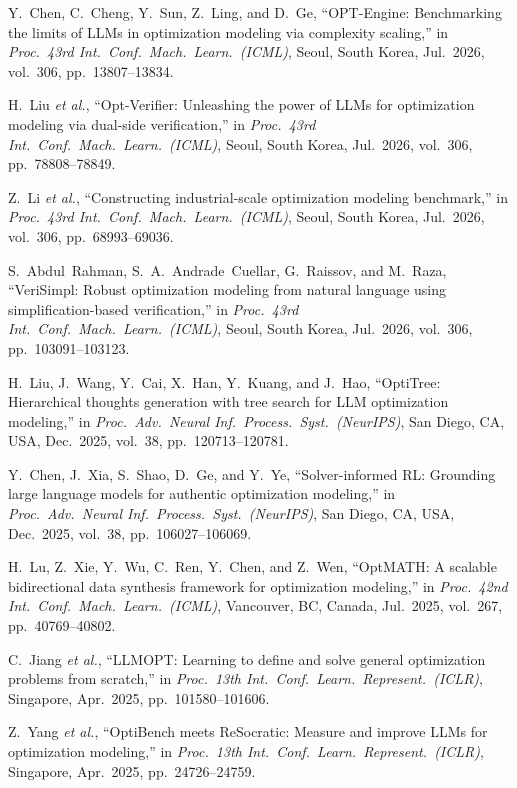 \documentclass[11pt,a4paper]{article}
\begin{document}
{\small
\begin{enumerate}[label={[\arabic*]}, leftmargin=2.2em, itemsep=1pt]
\item Y.~Chen, C.~Cheng, Y.~Sun, Z.~Ling, and D.~Ge, ``OPT-Engine: Benchmarking the limits of LLMs in optimization modeling via complexity scaling,'' in \textit{Proc.\ 43rd Int.\ Conf.\ Mach.\ Learn.\ (ICML)}, Seoul, South Korea, Jul.\ 2026, vol.~306, pp.~13807--13834.
\item H.~Liu \textit{et al.}, ``Opt-Verifier: Unleashing the power of LLMs for optimization modeling via dual-side verification,'' in \textit{Proc.\ 43rd Int.\ Conf.\ Mach.\ Learn.\ (ICML)}, Seoul, South Korea, Jul.\ 2026, vol.~306, pp.~78808--78849.
\item Z.~Li \textit{et al.}, ``Constructing industrial-scale optimization modeling benchmark,'' in \textit{Proc.\ 43rd Int.\ Conf.\ Mach.\ Learn.\ (ICML)}, Seoul, South Korea, Jul.\ 2026, vol.~306, pp.~68993--69036.
\item S.~Abdul~Rahman, S.~A.~Andrade~Cuellar, G.~Raissov, and M.~Raza, ``VeriSimpl: Robust optimization modeling from natural language using simplification-based verification,'' in \textit{Proc.\ 43rd Int.\ Conf.\ Mach.\ Learn.\ (ICML)}, Seoul, South Korea, Jul.\ 2026, vol.~306, pp.~103091--103123.
\item H.~Liu, J.~Wang, Y.~Cai, X.~Han, Y.~Kuang, and J.~Hao, ``OptiTree: Hierarchical thoughts generation with tree search for LLM optimization modeling,'' in \textit{Proc.\ Adv.\ Neural Inf.\ Process.\ Syst.\ (NeurIPS)}, San Diego, CA, USA, Dec.\ 2025, vol.~38, pp.~120713--120781.
\item Y.~Chen, J.~Xia, S.~Shao, D.~Ge, and Y.~Ye, ``Solver-informed RL: Grounding large language models for authentic optimization modeling,'' in \textit{Proc.\ Adv.\ Neural Inf.\ Process.\ Syst.\ (NeurIPS)}, San Diego, CA, USA, Dec.\ 2025, vol.~38, pp.~106027--106069.
\item H.~Lu, Z.~Xie, Y.~Wu, C.~Ren, Y.~Chen, and Z.~Wen, ``OptMATH: A scalable bidirectional data synthesis framework for optimization modeling,'' in \textit{Proc.\ 42nd Int.\ Conf.\ Mach.\ Learn.\ (ICML)}, Vancouver, BC, Canada, Jul.\ 2025, vol.~267, pp.~40769--40802.
\item C.~Jiang \textit{et al.}, ``LLMOPT: Learning to define and solve general optimization problems from scratch,'' in \textit{Proc.\ 13th Int.\ Conf.\ Learn.\ Represent.\ (ICLR)}, Singapore, Apr.\ 2025, pp.~101580--101606.
\item Z.~Yang \textit{et al.}, ``OptiBench meets ReSocratic: Measure and improve LLMs for optimization modeling,'' in \textit{Proc.\ 13th Int.\ Conf.\ Learn.\ Represent.\ (ICLR)}, Singapore, Apr.\ 2025, pp.~24726--24759.

\end{enumerate}}
\end{document}
